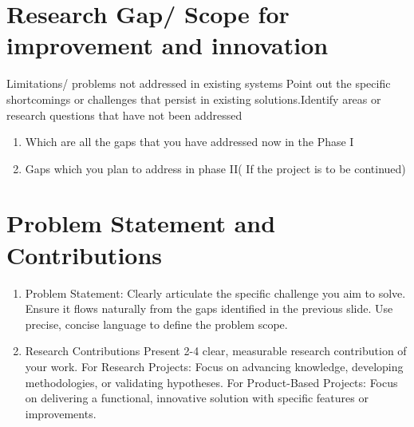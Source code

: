 \section{Research Gap/ Scope for improvement and innovation}

Limitations/ problems not addressed in existing systems Point out the specific shortcomings or challenges that persist in existing solutions.Identify areas or research questions that have not been addressed
\begin{enumerate}
    \item Which are all the gaps that you have addressed now in the Phase I
    \item Gaps which you plan to address in phase II( If the project is to be continued)
\end{enumerate}


\section{Problem Statement and Contributions}

\begin{enumerate}
    \item Problem Statement: Clearly articulate the specific challenge you aim to solve. Ensure it flows naturally from the gaps identified in the previous slide. Use precise, concise language to define the problem scope.
    \item  Research Contributions Present 2-4 clear, measurable research contribution of your work. For Research Projects: Focus on advancing knowledge, developing methodologies, or validating hypotheses. For Product-Based Projects: Focus on delivering a functional, innovative solution with specific features or improvements.
\end{enumerate}